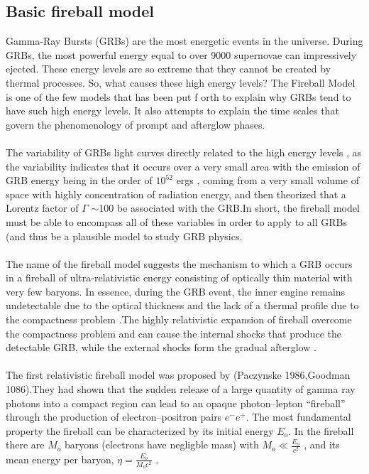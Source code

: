 \subsection{ Basic fireball model }
Gamma-Ray Bursts (GRBs)  are  the  most  energetic  events  in  the  universe. During GRBs, the  most  powerful  energy  equal  to over  9000 supernovae  can impressively ejected.  These   energy  levels   are  so   extreme   that  they  cannot  be  created  by  thermal  processes. So, what  causes  these  high  energy  levels? The Fireball Model  is   one  of  the   few   models   that  has   been  put f orth  to  explain why  GRBs  tend   to   have  such   high  energy   levels. It  also  attempts  to explain  the  time  scales  that  govern  the   phenomenology  of  prompt and afterglow   phases.\citep{13} \citep{14}\\\\ 
The   variability  of  GRBs   light  curves   directly  related  to  the  high  energy  levels ,  as  the   variability   indicates  that  it  occurs  over  a very small    area  with  the   emission    of  GRB   energy  being  in  the order of $10^{52}$ ergs , coming  from   a very  small   volume  of   space   with  highly concentration   of  radiation   energy,  and   then   theorized  that   a Lorentz factor of $ \Gamma $ $ \sim $100  be  associated   with   the  GRB.In  short, the fireball  model   must  be  able  to  encompass   all  of  these  variables  in order  to apply to   all  GRBs   (and  thus  be   a plausible  model  to  study  GRB  physics.\citep{14}\\\\
The  name of the  fireball model  suggests the mechanism to which a GRB occurs in a fireball  of  ultra-relativistic  energy  consisting  of  optically  thin  material with  very  few  baryons. In  essence, during  the   GRB  event, the inner engine remains  undetectable  due  to  the  optical  thickness  and  the lack of a thermal profile due  to  the  compactness  problem .The  highly relativistic expansion of fireball  overcome  the  compactness  problem  and  can cause  the internal shocks that  produce  the  detectable  GRB, while  the  external  shocks  form  the gradual afterglow \citep{15}.\\\\
 The  first  relativistic  fireball  model  was  proposed  by (Paczynske 1986,Goodman 1086).They  had  shown  that  the  sudden  release   of a large  quantity  of gamma ray  photons  into  a compact  region   can  lead  to  an  opaque  photon–lepton “fireball” through  the  production  of  electron–positron pairs  $ e^{-} e^{+} $. The  most  fundamental  property  the  fireball  can  be  characterized  by its initial  energy $ E_{o}$. In  the  fireball  there  are $ M_{o} $  baryons  (electrons  have  negligble  mass)  with $ M_{o} \ll\frac{E_{o}}{c^{2}}$ , and its mean energy per baryon, $\eta = \frac{E_{o}}{M_{o}c^{2}}$ \citep{14, 15}.\\\\

